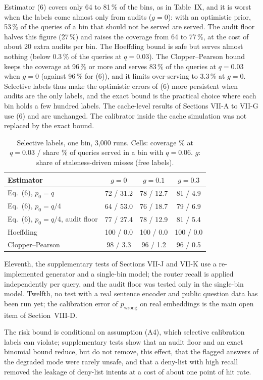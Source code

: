 Estimator (6) covers only 64 to 81\,\% of the bins, as in Table~IX, and it is worst when the labels come almost only from audits ($g=0$): with an optimistic prior, 53\,\% of the queries of a bin that should not be served are served. The audit floor halves this figure (27\,\%) and raises the coverage from 64 to 77\,\%, at the cost of about 20 extra audits per bin. The Hoeffding bound is safe but serves almost nothing (below 0.3\,\% of the queries at $q=0.03$). The Clopper--Pearson bound keeps the coverage at 96\,\% or more and serves 83\,\% of the queries at $q=0.03$ when $g=0$ (against 96\,\% for (6)), and it limits over-serving to 3.3\,\% at $g=0$. Selective labels thus make the optimistic errors of (6) more persistent when audits are the only labels, and the exact bound is the practical choice where each bin holds a few hundred labels. The cache-level results of Sections VII-A to VII-G use (6) and are unchanged. The calibrator inside the cache simulation was not replaced by the exact bound.

\begin{table}[t]
\centering
\caption{Selective labels, one bin, 3,000 runs. Cells: coverage \% at $q=0.03$ / share \% of queries served in a bin with $q=0.06$. $g$: share of staleness-driven misses (free labels).}
\label{tab:suppXIII}
\footnotesize
\begin{tabular}{@{}lccc@{}}
\toprule
Estimator & $g=0$ & $g=0.1$ & $g=0.3$\\
\midrule
Eq.~(6), $p_0=q$ & 72 / 31.2 & 78 / 12.7 & 81 / 4.9\\
Eq.~(6), $p_0=q/4$ & 64 / 53.0 & 76 / 18.7 & 79 / 6.9\\
Eq.~(6), $p_0=q/4$, audit floor & 77 / 27.4 & 78 / 12.9 & 81 / 5.4\\
Hoeffding & 100 / 0.0 & 100 / 0.0 & 100 / 0.0\\
Clopper--Pearson & 98 / 3.3 & 96 / 1.2 & 96 / 0.5\\
\bottomrule
\end{tabular}
\end{table}

Eleventh, the supplementary tests of Sections VII-J and VII-K use a re-implemented generator and a single-bin model; the router recall is applied independently per query, and the audit floor was tested only in the single-bin model. Twelfth, no test with a real sentence encoder and public question data has been run yet; the calibration error of $p_{\mathrm{wrong}}$ on real embeddings is the main open item of Section~VIII-D.

The risk bound is conditional on assumption (A4), which selective calibration labels can violate; supplementary tests show that an audit floor and an exact binomial bound reduce, but do not remove, this effect, that the flagged answers of the degraded mode were rarely unsafe, and that a deny-list with high recall removed the leakage of deny-list intents at a cost of about one point of hit rate.
